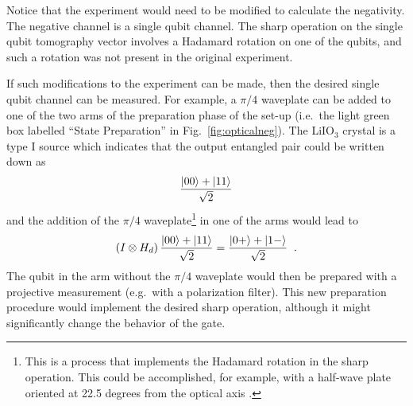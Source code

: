 Notice that the experiment would need to be modified to calculate the negativity.  The negative channel is a single qubit channel.  The sharp operation on the single qubit tomography vector involves a Hadamard rotation on one of the qubits, and such a rotation was not present in the original experiment. 

If such modifications to the experiment can be made, then the desired single qubit channel can be measured.  For example, a $\pi/4$ waveplate can be added to one of the two arms of the preparation phase of the set-up (i.e.\ the light green box labelled ``State Preparation'' in Fig.\ \ref{fig:opticalneg}).  The LiIO$_3$ crystal is a type I source which indicates that the output entangled pair could be written down as \cite{Kok2010}
$$
\frac{\left|00\right\rangle+\left|11\right\rangle}{\sqrt{2}}
$$  
and the addition of the $\pi/4$ waveplate\footnote{This is a process that implements the Hadamard rotation in the sharp operation.  This could be accomplished, for example, with a half-wave plate oriented at 22.5 degrees from the optical axis \cite{Ralph2010}.} in one of the arms would lead to
$$
\left(I\otimes H_d\right) \frac{\left|00\right\rangle+\left|11\right\rangle}{\sqrt{2}} = \frac{\left|0+\right\rangle+\left|1-\right\rangle}{\sqrt{2}}\;\;.
$$  
The qubit in the arm without the $\pi/4$ waveplate would then be prepared with a projective measurement (e.g.\ with a polarization filter).  This new preparation procedure would implement the desired sharp operation, although it might significantly change the behavior of the gate.

